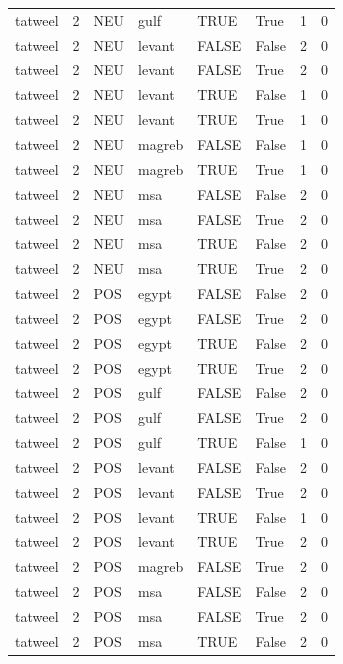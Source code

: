 \begin{tabular}{llllllrr}
tatweel & 2 & NEU & gulf & TRUE & True & 1 & 0 \\
tatweel & 2 & NEU & levant & FALSE & False & 2 & 0 \\
tatweel & 2 & NEU & levant & FALSE & True & 2 & 0 \\
tatweel & 2 & NEU & levant & TRUE & False & 1 & 0 \\
tatweel & 2 & NEU & levant & TRUE & True & 1 & 0 \\
tatweel & 2 & NEU & magreb & FALSE & False & 1 & 0 \\
tatweel & 2 & NEU & magreb & TRUE & True & 1 & 0 \\
tatweel & 2 & NEU & msa & FALSE & False & 2 & 0 \\
tatweel & 2 & NEU & msa & FALSE & True & 2 & 0 \\
tatweel & 2 & NEU & msa & TRUE & False & 2 & 0 \\
tatweel & 2 & NEU & msa & TRUE & True & 2 & 0 \\
tatweel & 2 & POS & egypt & FALSE & False & 2 & 0 \\
tatweel & 2 & POS & egypt & FALSE & True & 2 & 0 \\
tatweel & 2 & POS & egypt & TRUE & False & 2 & 0 \\
tatweel & 2 & POS & egypt & TRUE & True & 2 & 0 \\
tatweel & 2 & POS & gulf & FALSE & False & 2 & 0 \\
tatweel & 2 & POS & gulf & FALSE & True & 2 & 0 \\
tatweel & 2 & POS & gulf & TRUE & False & 1 & 0 \\
tatweel & 2 & POS & levant & FALSE & False & 2 & 0 \\
tatweel & 2 & POS & levant & FALSE & True & 2 & 0 \\
tatweel & 2 & POS & levant & TRUE & False & 1 & 0 \\
tatweel & 2 & POS & levant & TRUE & True & 2 & 0 \\
tatweel & 2 & POS & magreb & FALSE & True & 2 & 0 \\
tatweel & 2 & POS & msa & FALSE & False & 2 & 0 \\
tatweel & 2 & POS & msa & FALSE & True & 2 & 0 \\
tatweel & 2 & POS & msa & TRUE & False & 2 & 0 \\
\bottomrule
\end{tabular}
